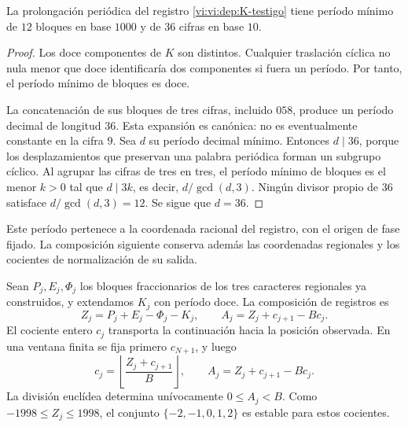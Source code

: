 \begin{proposition}
\label{vi:vi:dep:periodo-minimo-k}
La prolongación periódica del registro \eqref{vi:vi:dep:K-testigo}
tiene período mínimo de \(12\) bloques en base \(1000\) y de
\(36\) cifras en base \(10\).
\end{proposition}
\begin{proof}
Los doce componentes de \(K\) son distintos. Cualquier traslación
cíclica no nula menor que doce identificaría dos componentes si fuera
un período. Por tanto, el período mínimo de bloques es doce.

La concatenación de sus bloques de tres cifras, incluido \(058\),
produce un período decimal de longitud \(36\). Esta expansión es
canónica: no es eventualmente constante en la cifra \(9\).
Sea \(d\) su período decimal mínimo. Entonces \(d\mid36\),
porque los desplazamientos que preservan una palabra periódica forman
un subgrupo cíclico. Al agrupar las cifras de tres en tres, el período
mínimo de bloques es el menor \(k>0\) tal que \(d\mid3k\), es
decir, \(d/\gcd(d,3)\). Ningún divisor propio de \(36\)
satisface \(d/\gcd(d,3)=12\). Se sigue que \(d=36\).
\end{proof}

Este período pertenece a la coordenada racional del registro, con el
origen de fase fijado. La composición siguiente conserva además las
coordenadas regionales y los cocientes de normalización de su salida.

Sean \(P_j,E_j,\Phi_j\) los bloques fraccionarios de los tres
caracteres regionales ya construidos, y extendamos \(K_j\) con período
doce. La composición de registros es
\begin{equation}
 Z_j=P_j+E_j-\Phi_j-K_j,
 \qquad
 A_j=Z_j+c_{j+1}-Bc_j.
 \label{vi:vi:dep:normalizacion-alpha}
\end{equation}
El cociente entero \(c_j\) transporta la continuación hacia la posición
observada. En una ventana finita se fija primero \(c_{N+1}\), y luego
\[
 c_j=\left\lfloor\frac{Z_j+c_{j+1}}B\right\rfloor,
 \qquad A_j=Z_j+c_{j+1}-Bc_j.
\]
La división euclídea determina unívocamente \(0\le A_j<B\).
Como \(-1998\le Z_j\le1998\), el conjunto
\(\{-2,-1,0,1,2\}\) es estable para estos cocientes.

